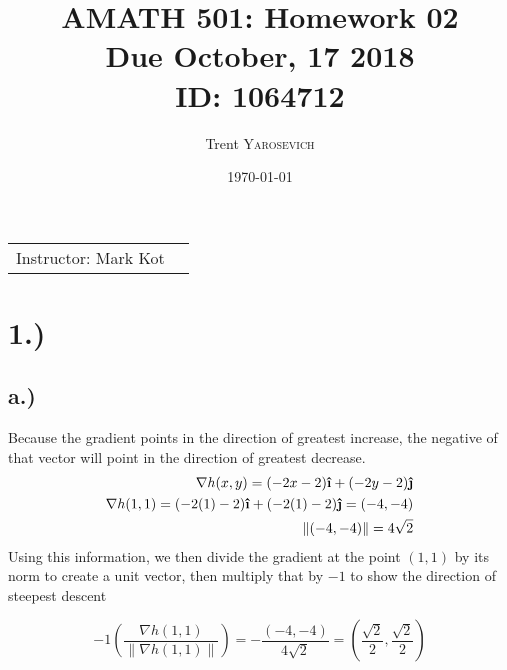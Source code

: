 \documentclass{article}
\title{AMATH 501: Homework 02 \\Due October, 17 2018 \\ ID: 1064712} %
\author{Trent \textsc{Yarosevich}} %
\date{\today} %
\newcommand{\uveci}{{\bm{\hat{\textnormal{\bfseries\i}}}}}
\newcommand{\uvecj}{{\bm{\hat{\textnormal{\bfseries\j}}}}}
\begin{document}
\maketitle %
\setlength\parindent{1cm}

\begin{center}
\begin{tabular}{l r}
Instructor: Mark Kot %
\end{tabular}
\end{center}


\section*{\bf{1.)}}
\subsection*{a.)}
Because the gradient points in the direction of greatest increase, the negative of that vector will point in the direction of greatest decrease.
\begin{equation}
\begin{aligned}
\nabla h(x,y) = (-2x - 2)\uveci + (-2y -2)\uvecj \\
\nabla h(1, 1) = (-2(1) -2)\uveci + (-2(1) - 2)\uvecj = (-4, -4)\\ 
\|(-4, -4)\| = 4\sqrt{2} \\
\end{aligned}
\end{equation}
Using this information, we then divide the gradient at the point $(1,1)$ by its norm to create a unit vector, then multiply that by $-1$ to show the direction of steepest descent

\begin{tcolorbox}[minipage,colback=white,arc=0pt,outer arc=0pt]
\begin{equation}
-1(\frac{\nabla h(1,1)}{\|\nabla h(1,1)\|}) = -\frac{(-4, -4)}{4\sqrt{2}} = (\frac{\sqrt{2}}{2},\frac{\sqrt{2}}{2})
\end{equation}
\end{tcolorbox}
\end{document}
